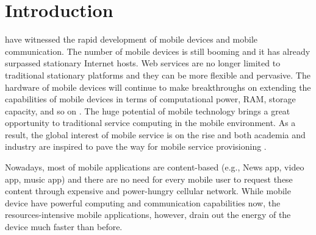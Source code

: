 \documentclass[10pt,journal,compsoc]{IEEEtran}
\begin{document}
\maketitle



\IEEEdisplaynontitleabstractindextext

\IEEEpeerreviewmaketitle


\ifCLASSOPTIONcompsoc
{}
\else
\section{Introduction}
\label{sec:introduction}
\fi


 have witnessed the rapid development of mobile devices and mobile communication. 
The number of mobile devices is still booming and it has already surpassed stationary Internet hosts.
Web services are no longer limited to traditional stationary platforms and they can be more flexible and pervasive. 
The hardware of mobile devices will continue to make breakthroughs on extending the capabilities of mobile devices in terms of computational power, RAM, storage capacity, and so on \cite{Deng2017}. 
The huge potential of mobile technology brings a great opportunity to traditional service computing in the mobile environment. As a result, the global interest of mobile service is on the rise and both academia and industry are inspired to pave the way for mobile service provisioning \cite{dinh2013survey}.

Nowadays, most of mobile applications are content-based (e.g., News app, video app, music app) and there are no need for every mobile user to request these content through expensive and power-hungry cellular network.
While mobile device have powerful computing and communication capabilities now, the resources-intensive mobile applications, however, drain out the energy of the device much faster than before. 
\end{document}
